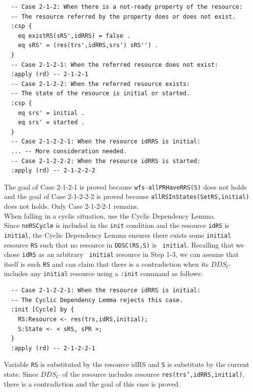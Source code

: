 \documentclass[12pt]{report}
\newcommand{\stt}[1]{{\small{\tt {#1}}}}
\begin{document}
\begin{verbatim}
  -- Case 2-1-2: When there is a not-ready property of the resource:
  -- The resource referred by the property does or does not exist.
  :csp {
    eq existRS(sRS',idRRS) = false .
    eq sRS' = (res(trs',idRRS,srs') sRS'') .
  }
  -- Case 2-1-2-1: When the referred resource does not exist:
  :apply (rd) -- 2-1-2-1
  -- Case 2-1-2-2: When the referred resource exists:
  -- The state of the resource is initial or started.
  :csp { 
    eq srs' = initial .
    eq srs' = started .
  }
  -- Case 2-1-2-2-1: When the resource idRRS is initial:
  ... -- More consideration needed.
  -- Case 2-1-2-2-2: When the resource idRRS is started:
  :apply (rd) -- 2-1-2-2-2
\end{verbatim}
The goal of Case 2-1-2-1 is proved because \stt{wfs-allPRHaveRRS(S)}
does not holds and the goal of Case 2-1-2-2-2 is proved because
\stt{allRSInStates(SetRS,initial)} does not holds.  Only Case
2-1-2-2-1 remains.\\

 When falling in a cyclic situation, use the
Cyclic Dependency Lemma. \\ Since {\tt noRSCycle} is included in the
{\tt init} condition and the resource {\tt idRS} is {\tt initial}, the
Cyclic Dependency Lemma ensures there exists some {\tt initial}
resource {\tt RS} such that no resource in \stt{DDSC(RS,S)} is {\tt
  initial}. Recalling that we chose {\tt idRS} as an arbitrary {\tt
  initial} resource in Step 1-3, we can assume that itself is such
{\tt RS} and can claim that there is a contradiction when its $DDS_C$ includes
any {\tt initial} resource using a {\tt :init} command as follows:
\begin{verbatim}
  -- Case 2-1-2-2-1: When the resource idRRS is initial:
  -- The Cyclic Dependency Lemma rejects this case.
  :init [Cycle] by {
    RS:Resource <- res(trs,idRS,initial);
    S:State <- < sRS, sPR >;
  }
  :apply (rd) -- 2-1-2-2-1
\end{verbatim}
Variable {\tt RS} is substituted by the resource idRS and {\tt S} is
substitute by the current state. Since $DDS_C$ of the resource
includes resource \stt{res(trs',idRRS,initial)}, there is a
contradiction and the goal of this case is proved.
\end{document}
